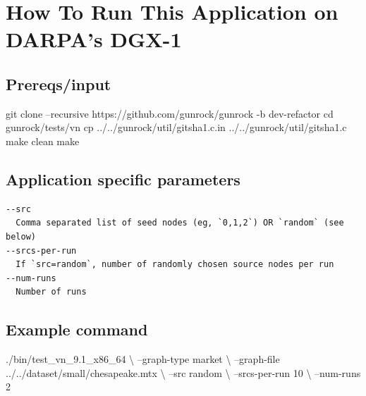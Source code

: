 \documentclass[10pt,oneside]{memoir}
\newenvironment{Shaded}{}{}
\newcommand{\BuiltInTok}[1]{#1}
\newcommand{\ExtensionTok}[1]{#1}
\newcommand{\FunctionTok}[1]{\textcolor[rgb]{0.02,0.16,0.49}{#1}}
\newcommand{\NormalTok}[1]{#1}
\begin{document}
\hypertarget{how-to-run-this-application-on-darpas-dgx-1-9}{%
\section{How To Run This Application on DARPA's
DGX-1}\label{how-to-run-this-application-on-darpas-dgx-1-9}}

\hypertarget{prereqsinput-9}{%
\subsection{Prereqs/input}\label{prereqsinput-9}}

\begin{Shaded}
\begin{Highlighting}[]
\FunctionTok{git}\NormalTok{ clone --recursive https://github.com/gunrock/gunrock -b dev-refactor}
\BuiltInTok{cd}\NormalTok{ gunrock/tests/vn}
\FunctionTok{cp}\NormalTok{ ../../gunrock/util/gitsha1.c.in ../../gunrock/util/gitsha1.c}
\FunctionTok{make}\NormalTok{ clean}
\FunctionTok{make}
\end{Highlighting}
\end{Shaded}

\hypertarget{application-specific-parameters-4}{%
\subsection{Application specific
parameters}\label{application-specific-parameters-4}}

\begin{verbatim}
--src
  Comma separated list of seed nodes (eg, `0,1,2`) OR `random` (see below)
--srcs-per-run
  If `src=random`, number of randomly chosen source nodes per run
--num-runs
  Number of runs
\end{verbatim}

\hypertarget{example-command-6}{%
\subsection{Example command}\label{example-command-6}}

\begin{Shaded}
\begin{Highlighting}[]
\ExtensionTok{./bin/test_vn_9.1_x86_64}\NormalTok{ \textbackslash{}}
\NormalTok{    --graph-type market \textbackslash{}}
\NormalTok{    --graph-file ../../dataset/small/chesapeake.mtx \textbackslash{}}
\NormalTok{    --src random \textbackslash{}}
\NormalTok{    --srcs-per-run 10 \textbackslash{}}
\NormalTok{    --num-runs 2}
\end{Highlighting}
\end{Shaded}
\end{document}
